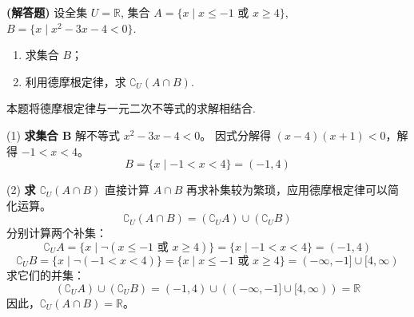 \begin{prob}[topic={德摩根定律与一元二次不等式}, score=12]
\textbf{(解答题)} 设全集 $U=\mathbb{R}$, 集合 $A=\{x\mid x \le -1 \text{ 或 } x \ge 4\}$, $B=\{x\mid x^2-3x-4<0\}$.
\begin{enumerate}
	\item 求集合 $B$；
	\item 利用德摩根定律，求 $\complement_U(A \cap B)$.
\end{enumerate}
\end{prob}
\begin{prob-sol}
本题将德摩根定律与一元二次不等式的求解相结合.

(1) \textbf{求集合 B}
解不等式 $x^2-3x-4<0$。
因式分解得 $(x-4)(x+1)<0$，解得 $-1 < x < 4$。
\[ B=\{x \mid -1 < x < 4\} = (-1, 4) \]

(2) \textbf{求 $\complement_U(A \cap B)$}
直接计算 $A \cap B$ 再求补集较为繁琐，应用德摩根定律可以简化运算。
\[ \complement_U(A \cap B) = (\complement_U A) \cup (\complement_U B) \]
分别计算两个补集：
\[ \complement_U A = \{x \mid \neg(x \le -1 \text{ 或 } x \ge 4)\} = \{x \mid -1 < x < 4\} = (-1, 4) \]
\[ \complement_U B = \{x \mid \neg(-1 < x < 4)\} = \{x \mid x \le -1 \text{ 或 } x \ge 4\} = (-\infty, -1] \cup [4, \infty) \]
求它们的并集：
\[ (\complement_U A) \cup (\complement_U B) = (-1, 4) \cup \left( (-\infty, -1] \cup [4, \infty) \right) = \mathbb{R} \]
因此，$\complement_U(A \cap B) = \mathbb{R}$。
\end{prob-sol}
